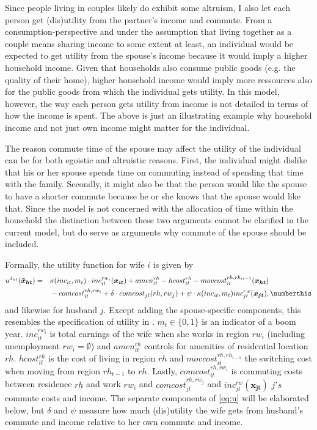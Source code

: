 Since people living in couples likely do exhibit some altruism, I also let each person get (dis)utility from the partner's income and commute. From a consumption-perspective and under the assumption that living together as a couple means sharing income to some extent at least, an individual would be expected to get utility from the spouse's income because it would imply a higher household income. Given that households also consume public goods (e.g. the quality of their home), higher household income would imply more ressources also for the public goods from which the individual gets utility. In this model, however, the way each person gets utility from income is not detailed in terms of how the income is spent. The above is just an illustrating example why household income and not just own income might matter for the individual. 

The reason commute time of the spouse may affect the utility of the individual can be for both egoistic and altruistic reasons. First, the individual might dislike that his or her spouse spends time on commuting instead of spending that time with the family. Secondly, it might also be that the person would like the spouse to have a shorter commute because he or she knows that the spouse would like that. Since the model is not concerned with the allocation of time within the household the distinction between these two arguments cannot be clarified in the current model, but do serve as arguments why commute of the spouse should be included.

Formally, the utility function for wife $i$ is given by
\begin{alignat*}{3}
&u^{d_{ht}}(\boldsymbol{\tilde{x}_{ht}})=&&\kappa(inc_{it},m_t)\cdot inc_{it}^{rw_i}(\boldsymbol{x_{it}})+amen_{it}^{rh}-hcost_{it}^{rh}-movcost_{it}^{rh,rh_{it-1}}(\boldsymbol{x_{ht}}) \\
& &&-comcost_{it}^{rh,rw_i}+\delta \cdot comcost_{jt}(rh,rw_j)+\psi\cdot \kappa(inc_{it},m_t) inc_{jt}^{rw}(\boldsymbol{x_{jt}}),\numberthis \label{eq:u}
\end{alignat*}
and likewise for husband $j$. Except adding the spouse-specific components, this resembles the specification of utility in \citet{Buchinsky2014}. $m_t\in\{0,1\}$ is an indicator of a boom year. $inc_{it}^{rw_i}$ is total earnings of the wife when she works in region $rw_i$ (including unemployment $rw_i=\emptyset$) and $amen_{it}^{rh}$ controls for amenities of residential location $rh$. $hcost_{it}^{rh}$ is the cost of living in region $rh$ and $movcost_{it}^{rh,rh_{t-1}}$ the switching cost when moving from region $rh_{t-1}$ to $rh$. Lastly, $comcost_{it}^{rh,rw_i}$ is commuting costs between residence $rh$ and work $rw_i$ and $comcost_{jt}^{rh,rw_j}$ and $inc_{jt}^{rw}(\boldsymbol{x_{jt}})$ $j's$ commute costs and income. The separate components of \eqref{eq:u} will be elaborated below, but $\delta$ and $\psi$ measure how much (dis)utility the wife gets from husband's commute and income relative to her own commute and income. 


